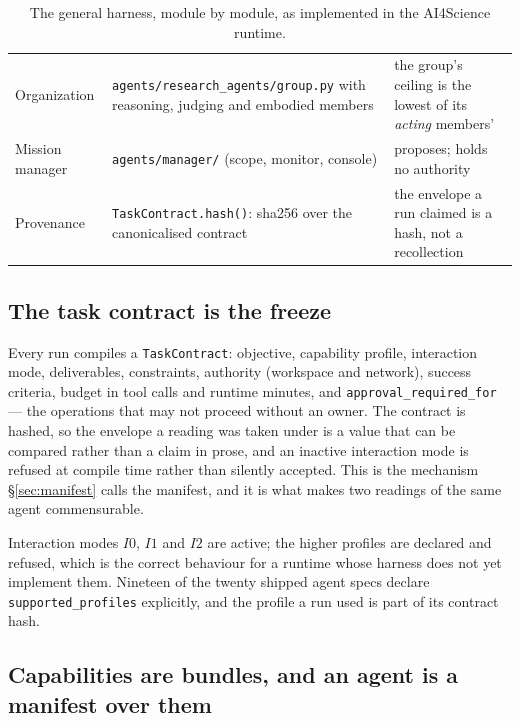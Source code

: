 \begin{table}[!htbp]
\begin{tabularx}{\textwidth}{@{}lYY@{}}
Organization & \texttt{agents/research\_agents/group.py} with reasoning, judging and embodied members & the group's ceiling is the lowest of its \emph{acting} members' \\
Mission manager & \texttt{agents/manager/} (scope, monitor, console) & proposes; holds no authority \\
Provenance & \texttt{TaskContract.hash()}: sha256 over the canonicalised contract & the envelope a run claimed is a hash, not a recollection \\
\bottomrule
\end{tabularx}
\caption{The general harness, module by module, as implemented in the AI4Science runtime.}
\label{tab:asbuilt}
\end{table}

\subsection{The task contract is the freeze}

Every run compiles a \texttt{TaskContract}: objective, capability profile, interaction mode, deliverables, constraints, authority (workspace and network), success criteria, budget in tool calls and runtime minutes, and \texttt{approval\_required\_for} --- the operations that may not proceed without an owner. The contract is hashed, so the envelope a reading was taken under is a value that can be compared rather than a claim in prose, and an inactive interaction mode is refused at compile time rather than silently accepted. This is the mechanism \S\ref{sec:manifest} calls the manifest, and it is what makes two readings of the same agent commensurable.

Interaction modes $I0$, $I1$ and $I2$ are active; the higher profiles are declared and refused, which is the correct behaviour for a runtime whose harness does not yet implement them. Nineteen of the twenty shipped agent specs declare \texttt{supported\_profiles} explicitly, and the profile a run used is part of its contract hash.

\subsection{Capabilities are bundles, and an agent is a manifest over them}

